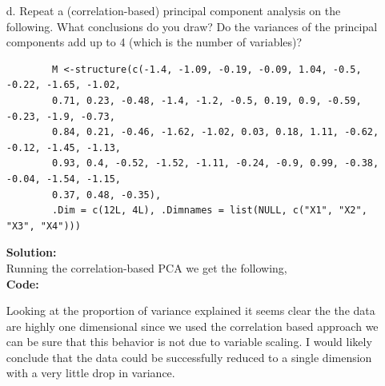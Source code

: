\documentclass[12pt]{article}
\makeatletter
\theoremstyle{homework}
\newenvironment{exercise}[1]
{\def\@currentlabel{#1}\exercisecore}
{\endexercisecore}
\newcommand{\localhead}[1]{\par\smallskip\noindent\textbf{#1}\nobreak\\}%
\newcommand\solution{\localhead{Solution:}}
\makeatother
\begin{document}
\begin{exercise}{3}
\begin{enumerate}
    \item[d.] Repeat a (correlation-based) principal component analysis on the following. What conclusions do you draw? Do the variances 
    of the principal components add up to 4 (which is the number of variables)?\\
    \begin{footnotesize}
      \begin{verbatim}
        M <-structure(c(-1.4, -1.09, -0.19, -0.09, 1.04, -0.5, -0.22, -1.65, -1.02,
        0.71, 0.23, -0.48, -1.4, -1.2, -0.5, 0.19, 0.9, -0.59, -0.23, -1.9, -0.73,
        0.84, 0.21, -0.46, -1.62, -1.02, 0.03, 0.18, 1.11, -0.62, -0.12, -1.45, -1.13,
        0.93, 0.4, -0.52, -1.52, -1.11, -0.24, -0.9, 0.99, -0.38, -0.04, -1.54, -1.15,
        0.37, 0.48, -0.35), 
        .Dim = c(12L, 4L), .Dimnames = list(NULL, c("X1", "X2", "X3", "X4")))
      \end{verbatim}
    \end{footnotesize}
    \solution Running the correlation-based PCA we get the following,\\
    \textbf{Code:}
    \begin{center}
    
    \end{center}
    Looking at the proportion of variance explained it seems clear the the data are highly one dimensional since we used the correlation based approach we 
    can be sure that this behavior is not due to variable scaling.  I would likely conclude that the data could be successfully reduced to a single dimension
    with a very little drop in variance. 
  \end{enumerate}
\end{exercise}
\vspace{1in}
\end{document}
